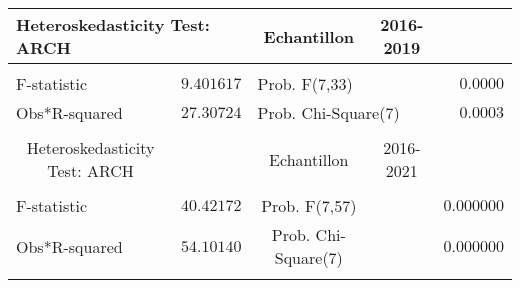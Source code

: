\sffamily
\begin{tabular}{lrrrr}
\multicolumn{2}{l}{Heteroskedasticity Test: ARCH}&\multicolumn{1}{c}{Echantillon}&\multicolumn{1}{c}{2016-2019}&\multicolumn{1}{c}{}\\
[4.5pt] \hline \\ [-4.5pt]
\multicolumn{1}{l}{F-statistic}&\multicolumn{1}{r}{$9.401617$}&\multicolumn{2}{l}{Prob. F(7,33)}&\multicolumn{1}{r}{$0.0000$}\\
\multicolumn{1}{l}{Obs*R-squared}&\multicolumn{1}{r}{$27.30724$}&\multicolumn{2}{l}{Prob. Chi-Square(7)}&\multicolumn{1}{r}{$0.0003$}\\
[4.5pt] \hline \\ [-4.5pt]
\multicolumn{1}{c}{Heteroskedasticity Test: ARCH}&\multicolumn{1}{c}{}&\multicolumn{1}{c}{Echantillon}&\multicolumn{1}{c}{2016-2021}&\multicolumn{1}{c}{}\\
[4.5pt] \hline \\ [-4.5pt]
\multicolumn{1}{l}{F-statistic}&\multicolumn{1}{c}{$40.42172$}&\multicolumn{1}{c}{Prob. F(7,57)}&\multicolumn{1}{c}{}&\multicolumn{1}{c}{$0.000000$}\\
\multicolumn{1}{l}{Obs*R-squared}&\multicolumn{1}{c}{$54.10140$}&\multicolumn{1}{c}{Prob. Chi-Square(7)}&\multicolumn{1}{c}{}&\multicolumn{1}{c}{$0.000000$}\\
[4.5pt] \hline \\ [-4.5pt]
\end{tabular}